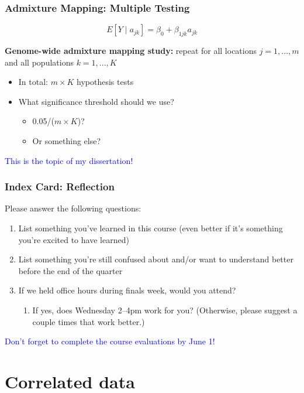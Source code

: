 \documentclass[12pt, 
hyperref={colorlinks=true, linkcolor=blue, urlcolor=cyan},dvipsnames]{beamer}
\begin{document}
\begin{frame}
\frametitle{Admixture Mapping: Multiple Testing}

$$E[Y \mid a_{jk}] = \beta_0 + \beta_{1jk} a_{jk}$$

\textbf{Genome-wide admixture mapping study:} repeat for all locations $j = 1, ..., m$ and all populations $k = 1, ..., K$

\begin{itemize}
\item In total: $m \times K$ hypothesis tests
\item What significance threshold should we use? \pause
	\begin{itemize}
	\item 0.05/($m\times K$)? 
	\item Or something else? \pause
	\end{itemize}
\end{itemize}

\textcolor{blue}{This is the topic of my dissertation!}

\end{frame}


\begin{frame}
\frametitle{Index Card: Reflection}

Please answer the following questions:
\begin{enumerate}
\item List something you've learned in this course (even better if it's something you're excited to have learned)
\item List something you're still confused about and/or want to understand better before the end of the quarter
\item If we held office hours during finals week, would you attend?
	\begin{enumerate}
	\item If yes, does Wednesday 2--4pm work for you? (Otherwise, please suggest a couple times that work better.)
	\end{enumerate}
\end{enumerate}

\textcolor{blue}{Don't forget to complete the course evaluations by June 1!}

\end{frame}


\section{Correlated data}
\end{document}
